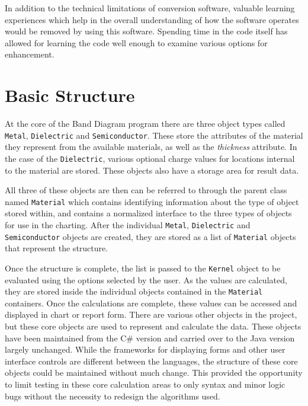 \documentclass[project]{bsu-ms}
\begin{document}
In addition to the technical limitations of conversion software, valuable learning experiences which help in the overall understanding of how the software operates would be removed by using this software. Spending time in the code itself has allowed for learning the code well enough to examine various options for enhancement.



\section{Basic Structure}\label{sec:basicStructure}
At the core of the Band Diagram program there are three object types called \texttt{Metal}, \texttt{Dielectric} and \texttt{Semiconductor}. These store the attributes of the material they represent from the available materials, as well as the \emph{thickness} attribute. In the case of the \texttt{Dielectric}, various optional charge values for locations internal to the material are stored. These objects also have a storage area for result data. 

All three of these objects are then can be referred to through the parent class named \texttt{Material} which contains identifying information about the type of object stored within, and contains a normalized interface to the three types of objects for use in the charting. After the individual \texttt{Metal}, \texttt{Dielectric} and \texttt{Semiconductor} objects are created, they are stored as a list of \texttt{Material} objects that represent the structure. 

Once the structure is complete, the list is passed to the \texttt{Kernel} object to be evaluated using the options selected by the user. As the values are calculated, they are stored inside the individual objects contained in the \texttt{Material} containers. Once the calculations are complete, these values can be accessed and displayed in chart or report form. There are various other objects in the project, but these core objects are used to represent and calculate the data. These objects have been maintained from the C\# version and carried over to the Java version largely unchanged. While the frameworks for displaying forms and other user interface controls are different between the languages, the structure of these core objects could be maintained without much change. This provided the opportunity to limit testing in these core calculation areas to only syntax and minor logic bugs without the necessity to redesign the algorithms used.
\end{document}
